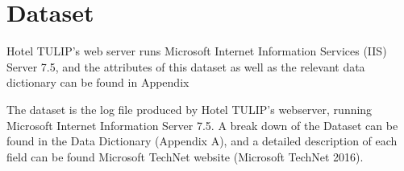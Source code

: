 \section{Dataset}

Hotel TULIP's web server runs Microsoft Internet Information Services (IIS) Server 7.5, and the attributes of this dataset as well as the relevant data dictionary can be found in Appendix~

The dataset is the log file produced by Hotel TULIP’s webserver, running Microsoft Internet Information Server 7.5. A break down of the Dataset can be found in the Data Dictionary (Appendix A), and a detailed description of each field can be found Microsoft TechNet website (Microsoft TechNet 2016).
